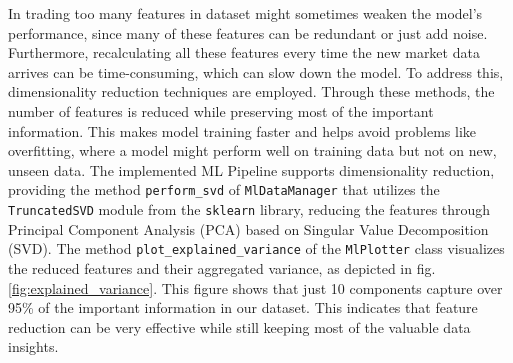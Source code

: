In trading too many features in dataset might sometimes weaken the model's performance, since many of these features can be redundant or just add noise.
Furthermore, recalculating all these features every time the new market data arrives can be time-consuming, which can slow down the model.
To address this, dimensionality reduction techniques are employed.
Through these methods, the number of features is reduced while preserving most of the important information.
This makes model training faster and helps avoid problems like overfitting, where a model might perform well on training data but not on new, unseen data.
The implemented ML Pipeline supports dimensionality reduction, providing the method \texttt{perform\_svd} of \texttt{MlDataManager} that utilizes the \texttt{TruncatedSVD} module from the \texttt{sklearn} library,
reducing the features through Principal Component Analysis (PCA) based on Singular Value Decomposition (SVD).
The method \texttt{plot\_explained\_variance} of the \texttt{MlPlotter} class visualizes the reduced features and their aggregated variance,
as depicted in fig.  \ref{fig:explained_variance}.
This figure shows that just 10 components capture over 95\% of the important information in our dataset.
This indicates that feature reduction can be very effective while still keeping most of the valuable data insights.

